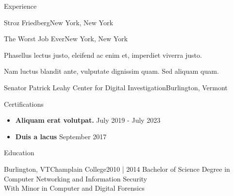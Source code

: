 \documentclass[]{mcdowellcv}
\begin{document}
\begin{cvsection}{Experience}
\begin{jobentry}{Stroz Friedberg}{New York, New York}
        

\begin{jobentry}{The Worst Job Ever}{New York, New York}
        
        
        \begin{jobresponsibilities}
            \item Phasellus lectus justo, eleifend ac enim et, imperdiet viverra justo.
            \item Nam luctus blandit ante, vulputate dignissim quam. Sed aliquam quam.
        \end{jobresponsibilities}
    \end{jobentry}


    \begin{jobentry}{Senator Patrick Leahy Center for Digital Investigation}{Burlington, Vermont}
        \begin{jobpositions}
        \end{jobpositions}
        
        
    \end{jobentry}

\begin{cvsection}{Certifications}
	\begin{cvsubsection}{}{}{}
		\begin{itemize}
			\setlength\itemsep{3pt}
			\item \textbf{Aliquam erat volutpat.} \hfill July 2019 - July 2023
			\item \textbf{Duis a lacus} \hfill September 2017
		\end{itemize}
	\end{cvsubsection}

\end{cvsection}

\begin{cvsection}{Education}
    \begin{cvsubsection}{Burlington, VT}{Champlain College}{2010 | 2014}
        \vspace{-1em}Bachelor of Science Degree in Computer Networking and Information Security\\
        \hspace*{1em}With Minor in Computer and Digital Forensics
    \end{cvsubsection}
\end{cvsection}


\end{jobentry}
\end{cvsection}
\end{document}
